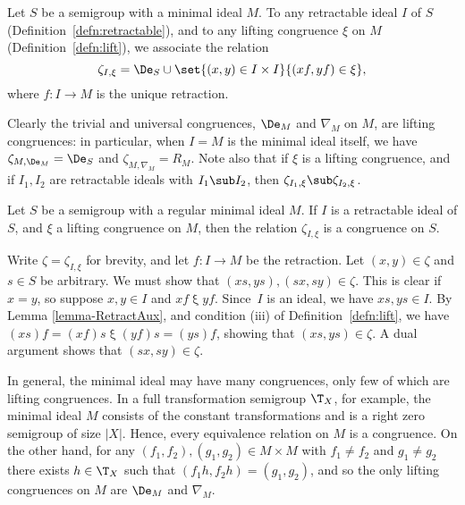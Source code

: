 \begin{defn}\label{defn:lift2}
Let $S$ be a semigroup with a minimal ideal $M$.  To any retractable ideal $I$ of $S$ (Definition~\ref{defn:retractable}), and to any lifting congruence $\xi$ on $M$ (Definition~\ref{defn:lift}), we
associate the relation
\[
  \zeta_{I,\xi}=\De_S\cup\set{(x,y)\in I\times I}{(xf,yf) \in \xi},
\]
where $f:I\to M$ is the unique retraction.
\end{defn}

Clearly the trivial and universal congruences, $\De_M$ and $\nabla_M$ on $M$, are lifting congruences: in particular, when $I=M$ is the minimal ideal itself, we have $\zeta_{M,\De_M} = \De_S$ and $\zeta_{M,\nabla_M}=R_M$.  Note also that if $\xi$ is a lifting congruence, and if $I_1,I_2$ are retractable ideals with $I_1\sub I_2$, then $\zeta_{I_1,\xi}\sub\zeta_{I_2,\xi}$.

\begin{prop}\label{prop:lift}
Let $S$ be a semigroup with a regular minimal ideal $M$.  If $I$ is a retractable ideal of $S$, and $\xi$ a lifting congruence on $M$, then the relation $\zeta_{I,\xi}$ is a congruence on $S$.
\end{prop}

\pf Write $\zeta=\zeta_{I,\xi}$ for brevity, and let $f:I\to M$ be the retraction.  Let $(x,y)\in\zeta$ and $s\in S$ be
arbitrary.  We must show that $(xs,ys),(sx,sy)\in\zeta$.  This is clear if
$x=y$, so suppose $x,y\in I$ and $xf\mathrel\xi yf$.  Since~$I$ is an
ideal, we have $xs,ys\in I$.  By Lemma \ref{lemma-RetractAux}, and condition (iii) of Definition~\ref{defn:lift}, we have $(xs)f = (xf)s \mathrel\xi
(yf)s = (ys)f$, showing that $(xs,ys)\in\zeta$.  A dual argument shows that
$(sx,sy)\in\zeta$. 
\epf

In general, the minimal ideal may have many congruences, only few of which are lifting congruences. 
In a full transformation
semigroup $\T_X$, for example, the minimal ideal $M$ consists of the
constant transformations and is a right zero semigroup of size $|X|$. Hence, every
equivalence relation on $M$ is a congruence. On the other hand, for any $(f_1,
f_2), (g_1,g_2)\in M \times M$ with $f_1\not = f_2$ and $g_1 \not =g_2$  
there exists $h\in \T_X$ such that $(f_1h, f_2h) = (g_1,g_2)$, and so 
the only lifting congruences on $M$ are $\De_M$ and $\nabla_M$. %

